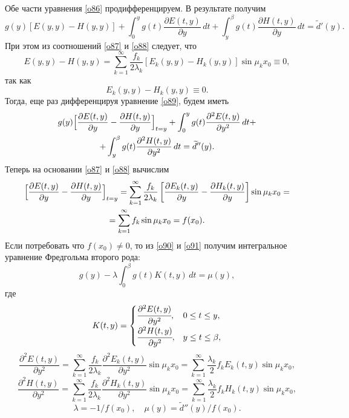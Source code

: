 Обе части уравнения \eqref{o86} продифференцируем. В результате получим
\begin{equation}
\label{o89}
g(y)\left[E(y,y)-H(y,y)\right]+\int _{0}^{y}g(t)\frac{\partial E(t,y)}{\partial y}\,dt+ \int _{y}^{\beta}g(t)\frac{\partial H(t,y)}{\partial y}\,dt=\widetilde{d}'(y).
\end{equation}
При этом из соотношений \eqref{o87} и \eqref{o88} следует, что
$$
E(y,y)-H(y,y)=\sum\limits_{k=1}^{\infty}\frac{f_k}{2\lambda_k}\left[E_k(y,y)-H_k(y,y)\right]\sin\mu_kx_0\equiv0,
$$
так как
$$
E_k(y,y)-H_k(y,y)\equiv0.
$$
Тогда, еще раз дифференцируя уравнение \eqref{o89}, будем иметь
\begin{multline}\label{o90}
g(y)\Bigl[\frac{\partial E(t,y)}{\partial y}-\frac{\partial H(t,y)}{\partial y}\Bigr]_{t=y}+
 \int _{0}^{y}g(t)\frac{\partial^2E(t,y)}{\partial y^2}\,dt+ 
\\
+ 
 \int _{y}^{\beta}g(t)\frac{\partial^2H(t,y)}{\partial y^2}\,dt=\widetilde{d}''(y).
\end{multline}
Теперь на основании \eqref{o87} и \eqref{o88} вычислим
\begin{multline}
\Bigl[\frac{\partial E(t,y)}{\partial y}-\frac{\partial H(t,y)}{\partial y}\Bigr]_{t=y}= \sum\limits_{k=1}^{\infty}\frac{f_k}{2\lambda_k}\left[\frac{\partial E_k(t,y)}{\partial y}- \frac{\partial H_k(t,y)}{\partial y}\right]\sin\mu_kx_0=
\\
\label{o91}
=\sum\limits_{k=1}^{\infty}f_k\sin\mu_kx_0=f(x_0).
\end{multline}
Если потребовать что $f(x_0)\neq0$, то из \eqref{o90} и \eqref{o91} получим интегральное уравнение Фредгольма второго рода:
\begin{equation}\label{o92}
g(y)-\lambda\int _{0}^{\beta}g(t)K(t,y)\,dt=\mu(y),
\end{equation}
где
\begin{equation}\label{o920}
K(t,y)=
 \begin{cases}
      \cfrac{\partial^2E(t,y)}{\partial y^2}, & 0\leq t\leq y, \\[2mm]
      \cfrac{\partial^2H(t,y)}{\partial y^2}, & y\leq t\leq \beta,
 \end{cases}
\end{equation}
\begin{equation}\label{o93}
\frac{\partial^2E(t,y)}{\partial y^2}= \sum\limits_{k=1}^{\infty}\frac{f_k}{2\lambda_k}\frac{\partial^2 E_k(t,y)}{\partial y^2} \sin\mu_kx_0=\sum\limits_{k=1}^{\infty}\frac{\lambda_k}{2}f_kE_k(t,y)\sin\mu_kx_0,
\end{equation}
\begin{equation}\label{o94}
\frac{\partial^2H(t,y)}{\partial y^2}= \sum\limits_{k=1}^{\infty}\frac{f_k}{2\lambda_k}\frac{\partial^2 H_k(t,y)}{\partial y^2} \sin\mu_kx_0=\sum\limits_{k=1}^{\infty}\frac{\lambda_k}{2}f_kH_k(t,y)\sin\mu_kx_0,
\end{equation}
$$
\lambda=-1/f(x_0), \quad  \mu(y)=\widetilde{d}''(y)/f(x_0).
$$

